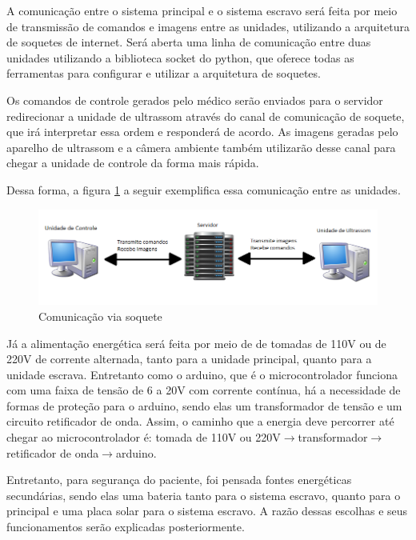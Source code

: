 A comunicação entre o sistema principal e o sistema escravo será feita por meio de transmissão de comandos e imagens entre as unidades, utilizando a arquitetura de soquetes de internet. Será aberta uma linha de comunicação entre duas unidades utilizando a biblioteca socket do python, que oferece todas as ferramentas para configurar e utilizar a arquitetura de soquetes.

Os comandos de controle gerados pelo médico serão enviados para o servidor redirecionar a unidade de ultrassom através do canal de comunicação de soquete, que irá interpretar essa ordem e responderá de acordo. As imagens geradas pelo aparelho de ultrassom e a câmera ambiente também utilizarão desse canal para chegar  a unidade de controle da forma mais rápida. 

Dessa forma, a figura \ref{intr_fig3} a seguir exemplifica essa comunicação entre as unidades.

\begin{figure}[H]
	\centering	\includegraphics[keepaspectratio=true,scale=0.6]{figuras/1_0_comunicacao_socket.png}
	\caption{Comunicação via soquete}
	\label{intr_fig3}
\end{figure}

Já a alimentação energética será feita por meio de de tomadas de 110V ou de 220V de corrente alternada, tanto para a unidade principal, quanto para a unidade escrava. Entretanto como o arduino, que é o microcontrolador funciona com uma faixa de tensão de 6 a 20V com corrente contínua, há a necessidade de formas de proteção para o arduino, sendo elas um transformador de tensão e um circuito retificador de onda. Assim, o caminho que a energia deve percorrer até chegar ao microcontrolador é: tomada de 110V ou 220V$\longrightarrow$transformador$\longrightarrow$retificador de onda$\longrightarrow$arduino.

    Entretanto, para segurança do paciente, foi pensada fontes energéticas secundárias, sendo elas uma bateria tanto para o sistema escravo, quanto para o principal e uma placa solar para o sistema escravo. A razão dessas escolhas e seus funcionamentos serão explicadas posteriormente.
